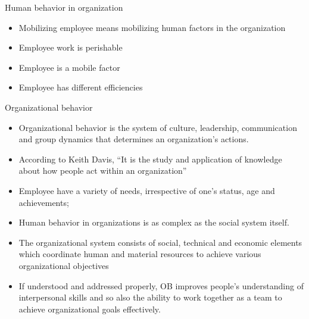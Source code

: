 \documentclass[12pt,ignorenonframetext,aspectratio=169]{beamer}
\providecommand{\tightlist}{%
  \setlength{\itemsep}{0pt}\setlength{\parskip}{0pt}}
\begin{document}
\begin{frame}{Human behavior in organization}
\protect\hypertarget{human-behavior-in-organization}{}
\begin{itemize}
\tightlist
\item
  Mobilizing employee means mobilizing human factors in the organization
\item
  Employee work is perishable
\item
  Employee is a mobile factor
\item
  Employee has different efficiencies
\end{itemize}
\end{frame}

\begin{frame}{Organizational behavior}
\protect\hypertarget{organizational-behavior}{}
\begin{itemize}
\tightlist
\item
  Organizational behavior is the system of culture, leadership,
  communication and group dynamics that determines an organization's
  actions.
\item
  According to Keith Davis, ``It is the study and application of
  knowledge about how people act within an organization''
\item
  Employee have a variety of needs, irrespective of one's status, age
  and achievements;
\item
  Human behavior in organizations is as complex as the social system
  itself.
\item
  The organizational system consists of social, technical and economic
  elements which coordinate human and material resources to achieve
  various organizational objectives
\item
  If understood and addressed properly, OB improves people's
  understanding of interpersonal skills and so also the ability to work
  together as a team to achieve organizational goals effectively.
\end{itemize}
\end{frame}
\end{document}
